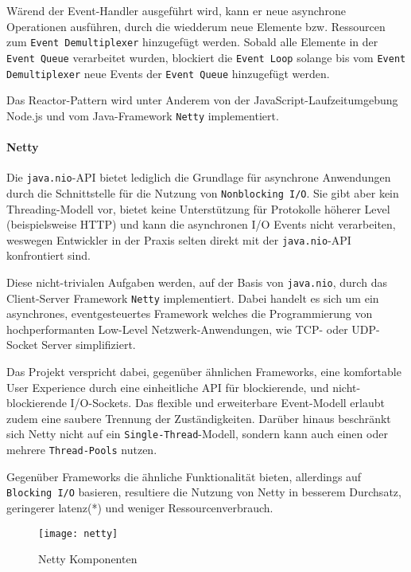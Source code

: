 Wärend der Event-Handler ausgeführt wird, kann er neue asynchrone Operationen ausführen, durch die wiedderum
neue Elemente bzw. Ressourcen zum \verb|Event Demultiplexer| hinzugefügt werden.
Sobald alle Elemente in der \verb|Event Queue| verarbeitet wurden, blockiert die \verb|Event Loop| solange
bis vom \verb|Event Demultiplexer| neue Events der \verb|Event Queue| hinzugefügt werden. \parencite{SchmidtReactorPattern}

Das Reactor-Pattern wird unter Anderem von der JavaScript-Laufzeitumgebung Node.js und vom Java-Framework \verb|Netty| implementiert.

\paragraph{Netty}

Die \verb|java.nio|-API bietet lediglich die Grundlage für asynchrone Anwendungen
durch die Schnittstelle für die Nutzung von \verb|Nonblocking I/O|.
Sie gibt aber kein Threading-Modell vor, bietet keine Unterstützung für Protokolle höherer Level (beispielsweise HTTP) und
kann die asynchronen I/O Events nicht verarbeiten, weswegen Entwickler in der Praxis selten direkt mit der \verb|java.nio|-API
konfrontiert sind.

Diese nicht-trivialen Aufgaben werden, auf der Basis von \verb|java.nio|, durch das Client-Server Framework \verb|Netty| implementiert.
Dabei handelt es sich um ein asynchrones, eventgesteuertes Framework welches
die Programmierung von hochperformanten Low-Level Netzwerk-Anwendungen, wie TCP- oder UDP-Socket Server simplifiziert. \parencite{NettyUserAction}

Das Projekt verspricht dabei, gegenüber ähnlichen Frameworks, eine komfortable User Experience durch eine einheitliche API für
blockierende, und nicht-blockierende I/O-Sockets. Das flexible und erweiterbare Event-Modell erlaubt zudem eine saubere Trennung der Zuständigkeiten.
Darüber hinaus beschränkt sich Netty nicht auf ein \verb|Single-Thread|-Modell, sondern kann auch einen oder mehrere \verb|Thread-Pools| nutzen.

Gegenüber Frameworks die ähnliche Funktionalität bieten, allerdings auf \verb|Blocking I/O| basieren, resultiere die Nutzung von Netty
in besserem Durchsatz, geringerer \Gls{latenz}(*) und weniger Ressourcenverbrauch. \parencite{Netty}

\begin{figure}[h!]
  \centering
  \texttt{[image: netty]}
  \caption{Netty Komponenten \parencite{Netty}}
  \label{fig:netty}
\end{figure}